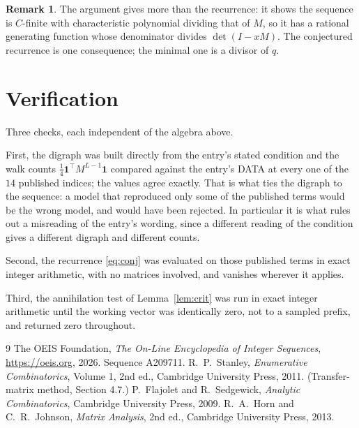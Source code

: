 \documentclass[11pt,a4paper]{article}
\theoremstyle{plain}
\theoremstyle{definition}
\newtheorem{remark}[theorem]{Remark}
\begin{document}
\begin{remark}
The argument gives more than the recurrence: it shows the sequence is $C$-finite with
characteristic polynomial dividing that of $M$, so it has a rational generating function
whose denominator divides $\det(I-xM)$. The conjectured recurrence is one consequence; the
minimal one is a divisor of $q$.
\end{remark}

\section{Verification}

Three checks, each independent of the algebra above.

First, the digraph was built directly from the entry's stated condition and the walk counts
$\tfrac1{4}\mathbf{1}^{\!\top}M^{L-1}\mathbf{1}$ compared against the entry's DATA at
every one of the $14$ published indices; the values agree exactly. That is what ties
the digraph to the sequence: a model that reproduced only some of the published terms would
be the wrong model, and would have been rejected. In particular it is what rules out a
misreading of the entry's wording, since a different reading of the condition gives a
different digraph and different counts.

Second, the recurrence \eqref{eq:conj} was evaluated on those published terms in exact
integer arithmetic, with no matrices involved, and vanishes wherever it applies.

Third, the annihilation test of Lemma~\ref{lem:crit} was run in exact integer arithmetic
until the working vector was identically zero, not to a sampled prefix, and returned zero
throughout.

\begin{thebibliography}{9}
 The OEIS Foundation, \emph{The On-Line Encyclopedia of Integer
Sequences}, \url{https://oeis.org}, 2026. Sequence A209711.
 R.~P.~Stanley, \emph{Enumerative Combinatorics}, Volume 1, 2nd ed.,
Cambridge University Press, 2011. (Transfer-matrix method, Section 4.7.)
 P.~Flajolet and R.~Sedgewick, \emph{Analytic Combinatorics}, Cambridge
University Press, 2009.
 R.~A.~Horn and C.~R.~Johnson, \emph{Matrix Analysis}, 2nd ed., Cambridge
University Press, 2013.
\end{thebibliography}
\end{document}
